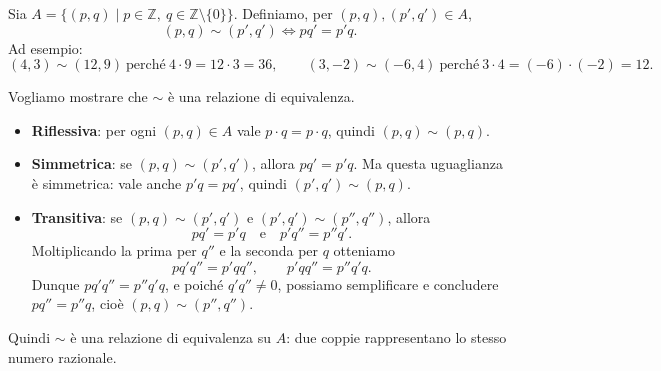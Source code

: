 \begin{esempio}
Sia $A = \{(p,q) \mid p \in \mathbb{Z},\ q \in \mathbb{Z}\setminus\{0\}\}$. Definiamo, per
\((p,q),(p',q')\in A\),
\[
(p,q) \sim (p',q') \iff pq' = p'q.
\]
Ad esempio:
\[
(4,3)\sim(12,9) \ \text{perché}\ 4\cdot9 = 12\cdot3 = 36,\qquad
(3,-2)\sim(-6,4) \ \text{perché}\ 3\cdot4 = (-6)\cdot(-2) = 12.
\]

Vogliamo mostrare che $\sim$ è una relazione di equivalenza.

\begin{itemize}
    \item \textbf{Riflessiva}: per ogni $(p,q)\in A$ vale $p\cdot q = p\cdot q$, quindi
          $(p,q)\sim(p,q)$.
    \item \textbf{Simmetrica}: se $(p,q)\sim(p',q')$, allora $pq' = p'q$. Ma questa uguaglianza
          è simmetrica: vale anche $p'q = pq'$, quindi $(p',q')\sim(p,q)$.
    \item \textbf{Transitiva}: se $(p,q)\sim(p',q')$ e $(p',q')\sim(p'',q'')$, allora
          \[
          pq' = p'q \quad\text{e}\quad p'q'' = p''q'.
          \]
          Moltiplicando la prima per $q''$ e la seconda per $q$ otteniamo
          \[
          pq'q'' = p'qq'', \qquad p'qq'' = p''q'q.
          \]
          Dunque $pq'q'' = p''q'q$, e poiché $q'q''\neq 0$, possiamo semplificare e concludere
          \(pq'' = p''q\), cioè \((p,q)\sim(p'',q'')\).
\end{itemize}

Quindi $\sim$ è una relazione di equivalenza su $A$: due coppie rappresentano lo stesso numero razionale.
\end{esempio}













 


